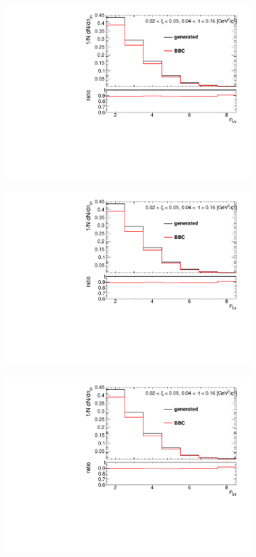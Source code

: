 \begin{figure}[h!]
	\centering
	\begin{subfigure}{.45\textwidth}
		\includegraphics[width=\textwidth,page=5]{chapters/chrgSTAR/img/bbcCorrection/xi_bbc.pdf}
	\end{subfigure}
	\begin{subfigure}{.45\textwidth}
		\includegraphics[width=\textwidth,page=6]{chapters/chrgSTAR/img/bbcCorrection/xi_bbc.pdf}
	\end{subfigure}
	\begin{subfigure}{.45\textwidth}
		\includegraphics[width=\textwidth,page=7]{chapters/chrgSTAR/img/bbcCorrection/xi_bbc.pdf}

\end{subfigure}
\end{figure}

